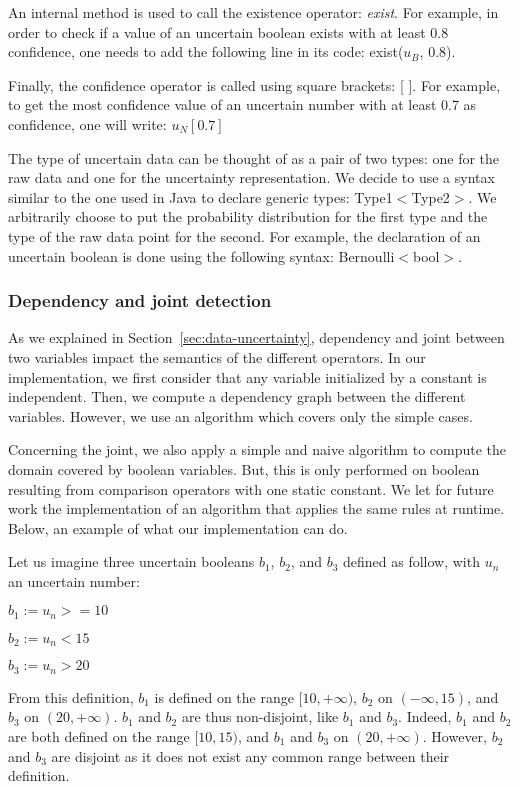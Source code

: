 An internal method is used to call the existence operator: \textit{exist}.
For example, in order to check if a value of an uncertain boolean exists with at least 0.8 confidence, one needs to add the following line in its code: exist($u_B$, 0.8).

Finally, the confidence operator is called using square brackets: [ ].
For example, to get the most confidence value of an uncertain number with at least 0.7 as confidence, one will write: $u_N[0.7]$

\bigskip
The type of uncertain data can be thought of as a pair of two types: one for the raw data and one for the uncertainty representation.
We decide to use a syntax similar to the one used in Java to declare generic types: Type1$<$Type2$>$.
We arbitrarily choose to put the probability distribution for the first type and the type of the raw data point for the second.
For example, the declaration of an uncertain boolean is done using the following syntax: Bernoulli$<$bool$>$.

\subsubsection{Dependency and joint detection}
As we explained in Section~\ref{sec:data-uncertainty}, dependency and joint between two variables impact the semantics of the different operators.
In our implementation, we first consider that any variable initialized by a constant is independent.
Then, we compute a dependency graph between the different variables.
However, we use an algorithm which covers only the simple cases.

Concerning the joint, we also apply a simple and naive algorithm to compute the domain covered by boolean variables.
But, this is only performed on boolean resulting from comparison operators with one static constant.
We let for future work the implementation of an algorithm that applies the same rules at runtime.
Below, an example of what our implementation can do.

Let us imagine three uncertain booleans $b_1$, $b_2$, and $b_3$ defined as follow, with $u_n$ an uncertain number: 
\begin{itemize*}
	\item[] $b_1 := u_n >= 10$
	\item[] $b_2 := u_n < 15$
	\item[] $b_3 := u_n > 20$
\end{itemize*}

From this definition, $b_1$ is defined on the range $[10, +\infty)$, $b_2$ on $(-\infty, 15)$, and $b_3$ on $(20, +\infty)$.
$b_1$ and $b_2$ are thus non-disjoint, like $b_1$ and $b_3$.
Indeed, $b_1$ and $b_2$ are both defined on the range $[10, 15)$, and $b_1$ and $b_3$ on $(20, +\infty)$.
However, $b_2$ and $b_3$ are disjoint as it does not exist any common range between their definition.

